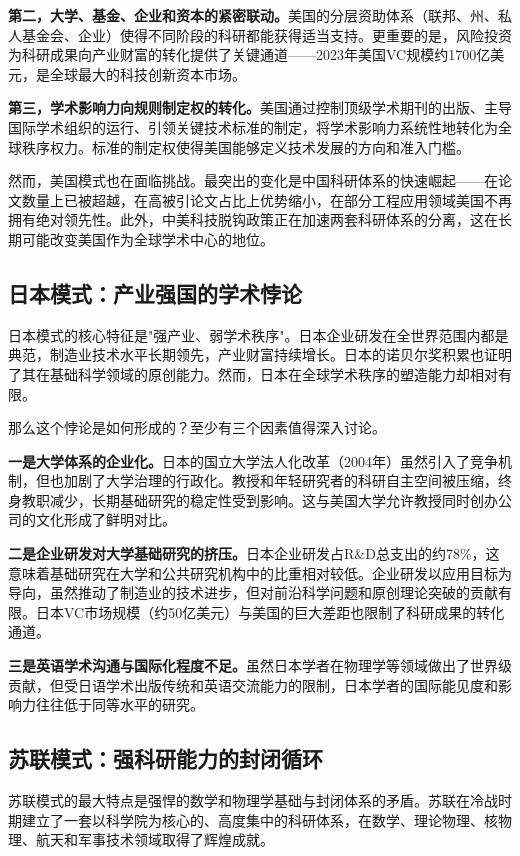 \textbf{第二，大学、基金、企业和资本的紧密联动。}美国的分层资助体系（联邦、州、私人基金会、企业）使得不同阶段的科研都能获得适当支持。更重要的是，风险投资为科研成果向产业财富的转化提供了关键通道——2023年美国VC规模约1700亿美元，是全球最大的科技创新资本市场。

\textbf{第三，学术影响力向规则制定权的转化。}美国通过控制顶级学术期刊的出版、主导国际学术组织的运行、引领关键技术标准的制定，将学术影响力系统性地转化为全球秩序权力。标准的制定权使得美国能够定义技术发展的方向和准入门槛。

然而，美国模式也在面临挑战。最突出的变化是中国科研体系的快速崛起——在论文数量上已被超越，在高被引论文占比上优势缩小，在部分工程应用领域美国不再拥有绝对领先性。此外，中美科技脱钩政策正在加速两套科研体系的分离，这在长期可能改变美国作为全球学术中心的地位。

\subsection{日本模式：产业强国的学术悖论}

日本模式的核心特征是"强产业、弱学术秩序"。日本企业研发在全世界范围内都是典范，制造业技术水平长期领先，产业财富持续增长。日本的诺贝尔奖积累也证明了其在基础科学领域的原创能力。然而，日本在全球学术秩序的塑造能力却相对有限。

那么这个悖论是如何形成的？至少有三个因素值得深入讨论。

\textbf{一是大学体系的企业化。}日本的国立大学法人化改革（2004年）虽然引入了竞争机制，但也加剧了大学治理的行政化。教授和年轻研究者的科研自主空间被压缩，终身教职减少，长期基础研究的稳定性受到影响。这与美国大学允许教授同时创办公司的文化形成了鲜明对比。

\textbf{二是企业研发对大学基础研究的挤压。}日本企业研发占R\&D总支出的约78\%，这意味着基础研究在大学和公共研究机构中的比重相对较低。企业研发以应用目标为导向，虽然推动了制造业的技术进步，但对前沿科学问题和原创理论突破的贡献有限。日本VC市场规模（约50亿美元）与美国的巨大差距也限制了科研成果的转化通道。

\textbf{三是英语学术沟通与国际化程度不足。}虽然日本学者在物理学等领域做出了世界级贡献，但受日语学术出版传统和英语交流能力的限制，日本学者的国际能见度和影响力往往低于同等水平的研究。

\subsection{苏联模式：强科研能力的封闭循环}

苏联模式的最大特点是强悍的数学和物理学基础与封闭体系的矛盾。苏联在冷战时期建立了一套以科学院为核心的、高度集中的科研体系，在数学、理论物理、核物理、航天和军事技术领域取得了辉煌成就。

